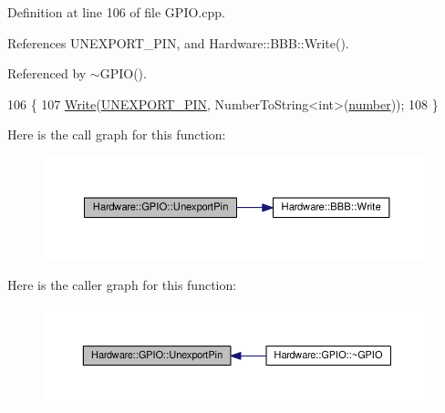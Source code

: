 Definition at line 106 of file G\+P\+I\+O.\+cpp.



References U\+N\+E\+X\+P\+O\+R\+T\+\_\+\+P\+I\+N, and Hardware\+::\+B\+B\+B\+::\+Write().



Referenced by $\sim$\+G\+P\+I\+O().


\begin{DoxyCode}
106                                  \{
107   \hyperlink{class_hardware_1_1_b_b_b_a155cc06f76d82a6b690ce5ea08e7c68e}{Write}(\hyperlink{_g_p_i_o_8h_a57a9168261422a24cc4b062b0376449b}{UNEXPORT\_PIN}, NumberToString<int>(\hyperlink{class_hardware_1_1_g_p_i_o_a1671a87bb70911b0a6a29019a068cf96}{number}));
108 \}
\end{DoxyCode}


Here is the call graph for this function\+:\nopagebreak
\begin{figure}[H]
\begin{center}
\leavevmode
\includegraphics[width=350pt]{class_hardware_1_1_g_p_i_o_ad56e9d73869a8dacc3245e33df4f5d24_cgraph}
\end{center}
\end{figure}




Here is the caller graph for this function\+:\nopagebreak
\begin{figure}[H]
\begin{center}
\leavevmode
\includegraphics[width=350pt]{class_hardware_1_1_g_p_i_o_ad56e9d73869a8dacc3245e33df4f5d24_icgraph}
\end{center}
\end{figure}


\hypertarget{class_hardware_1_1_g_p_i_o_afd1340f1a1907168e7dc4ad24027b96a}{}
